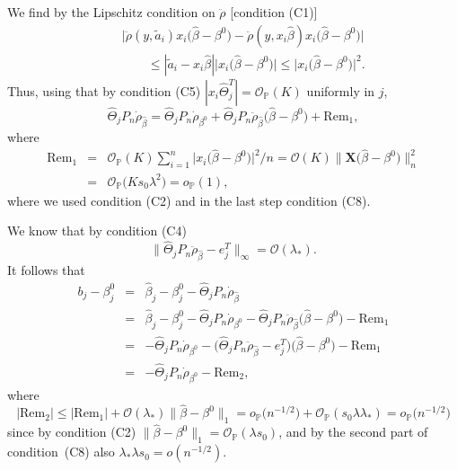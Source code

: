 \documentclass[aos,MSNbibl,dvips]{arximspdf}
\newcommand{\PP}{\mathbb{P}}
\newcommand{\bx}{\mathbf{X}}
\begin{document}
We find by the Lipschitz condition on $\ddot\rho$ [condition (C1)]
%
\begin{eqnarray*}
&&\bigl| \ddot\rho( y, \tilde a_i) x_i \bigl( \hat\beta-
\beta^0\bigr) - \ddot \rho ( y, x_i \hat\beta)
x_i \bigl( \hat\beta- \beta^0\bigr) \bigr| %
\\
&&\qquad\le | \tilde a_i - x_i \hat\beta| \bigl| x_i
\bigl(\hat\beta- \beta^0\bigr) \bigr| \le\bigl| x_i \bigl( \hat
\beta- \beta^0\bigr) \bigr|^2. %
\end{eqnarray*}
%
Thus, using that by condition (C5) $| x_i \hat\Theta_j^T | =
{\mathcal
O}_{\PP} (K) $ uniformly in $j$,
%
\[
\hat\Theta_j P_n \dot\rho_{\hat\beta} = \hat
\Theta_j P_n \dot \rho _{\beta^0} + \hat
\Theta_j P_n \ddot\rho_{\hat\beta} \bigl( \hat\beta-
\beta^0\bigr) + \mathrm{Rem}_1, %
\]
%
where
%
\begin{eqnarray*}
\mathrm{Rem}_1 &=& {\mathcal O}_{\PP} (K) \sum
_{i=1}^n \bigl| x_i \bigl( \hat\beta-
\beta^0\bigr) \bigr|^2/n = {\mathcal O}(K)\bigl \| \bx\bigl( \hat
\beta- \beta^0\bigr) \bigr\|_n^2 %
\\
&=& {\mathcal O}_{\PP} \bigl(Ks_0 \lambda^2
\bigr) = o_{\PP} (1), %
\end{eqnarray*}
%
where we used condition (C2) and in the last step condition (C8).

We know that by condition (C4)
%
\[
\bigl\| \hat\Theta_j P_n \ddot\rho_{\hat\beta} -
e_j^T \bigr\|_{\infty} = {\mathcal O} ( \lambda_*).
%
\]
%
It follows that
%
\begin{eqnarray*}
b_j- \beta_j^0 &=& \hat
\beta_j - \beta_j^0 - \hat
\Theta_j P_n \dot \rho_{\hat\beta}
\\
&=& \hat\beta_j - \beta_j^0 - \hat
\Theta_j P_n \dot\rho_{\beta
^0} - \hat
\Theta_j P_n \ddot\rho_{\hat\beta} \bigl( \hat\beta-
\beta^0\bigr) - \mathrm{Rem}_1
\\
&=& - \hat\Theta_j P_n \dot\rho_{\beta^0} - \bigl(
\hat\Theta_j P_n \ddot \rho_{\hat\beta} -
e_j^T\bigr) \bigl( \hat\beta- \beta^0\bigr)
- \mathrm{Rem}_1 \\
&=& -\hat\Theta_j P_n \dot
\rho_{\beta^0} - \mathrm{Rem }_2,
\end{eqnarray*}
%
where
%
\[
|\mathrm{Rem}_2 | \le|\mathrm{Rem}_1  | + {\mathcal O} (
\lambda_*)\bigl \| \hat \beta- \beta^0\bigr \|_1 =o_{\PP}
\bigl(n^{-1/2} \bigr) + {\mathcal O}_{\PP} (s_0
\lambda\lambda_*) = o_{\PP} \bigl(n^{-1/2} \bigr) %
\]
%
since by condition (C2) $\| \hat\beta- \beta^0 \|_1 = {\mathcal
O}_{\PP} ( \lambda s_0 ) $, and by
the second part of
condition~(C8) also $\lambda_* \lambda s_0 = o (n^{-1/2} ) $.
\end{document}
